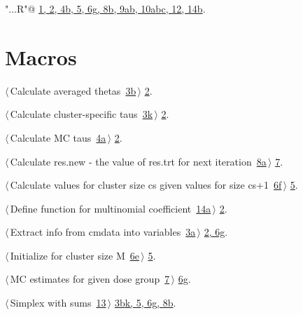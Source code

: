 \documentclass[reqno]{amsart}
\renewcommand{\NWlink}[2]{\hyperlink{#1}{#2}}
\begin{document}
{\small\begin{list}{}{\setlength{\itemsep}{-\parsep}\setlength{\itemindent}{-\leftmargin}}
\item \verb@"..\R\ExchMultinomial.R"@ {\footnotesize {\NWtxtDefBy} \NWlink{nuweb1}{1}\NWlink{nuweb2}{, 2}\NWlink{nuweb4b}{, 4b}\NWlink{nuweb5}{, 5}\NWlink{nuweb6g}{, 6g}\NWlink{nuweb8b}{, 8b}\NWlink{nuweb9a}{, 9a}\NWlink{nuweb9b}{b}\NWlink{nuweb10a}{, 10a}\NWlink{nuweb10b}{b}\NWlink{nuweb10c}{c}\NWlink{nuweb12}{, 12}\NWlink{nuweb14b}{, 14b}.
}
\end{list}}

\section{Macros}


{\small\begin{list}{}{\setlength{\itemsep}{-\parsep}\setlength{\itemindent}{-\leftmargin}}
\item $\langle\,$Calculate averaged thetas\nobreak\ {\footnotesize \NWlink{nuweb3b}{3b}}$\,\rangle$ {\footnotesize {\NWtxtRefIn} \NWlink{nuweb2}{2}.}
\item $\langle\,$Calculate cluster-specific taus\nobreak\ {\footnotesize \NWlink{nuweb3k}{3k}}$\,\rangle$ {\footnotesize {\NWtxtRefIn} \NWlink{nuweb2}{2}.}
\item $\langle\,$Calculate MC taus\nobreak\ {\footnotesize \NWlink{nuweb4a}{4a}}$\,\rangle$ {\footnotesize {\NWtxtRefIn} \NWlink{nuweb2}{2}.}
\item $\langle\,$Calculate res.new - the value of res.trt for next iteration\nobreak\ {\footnotesize \NWlink{nuweb8a}{8a}}$\,\rangle$ {\footnotesize {\NWtxtRefIn} \NWlink{nuweb7}{7}.}
\item $\langle\,$Calculate values for cluster size cs given values for size cs+1\nobreak\ {\footnotesize \NWlink{nuweb6f}{6f}}$\,\rangle$ {\footnotesize {\NWtxtRefIn} \NWlink{nuweb5}{5}.}
\item $\langle\,$Define function for multinomial coefficient\nobreak\ {\footnotesize \NWlink{nuweb14a}{14a}}$\,\rangle$ {\footnotesize {\NWtxtRefIn} \NWlink{nuweb2}{2}.}
\item $\langle\,$Extract info from cmdata into variables\nobreak\ {\footnotesize \NWlink{nuweb3a}{3a}}$\,\rangle$ {\footnotesize {\NWtxtRefIn} \NWlink{nuweb2}{2}\NWlink{nuweb6g}{, 6g}.
}
\item $\langle\,$Initialize for cluster size M\nobreak\ {\footnotesize \NWlink{nuweb6e}{6e}}$\,\rangle$ {\footnotesize {\NWtxtRefIn} \NWlink{nuweb5}{5}.}
\item $\langle\,$MC estimates for given dose group\nobreak\ {\footnotesize \NWlink{nuweb7}{7}}$\,\rangle$ {\footnotesize {\NWtxtRefIn} \NWlink{nuweb6g}{6g}.}
\item $\langle\,$Simplex with sums\nobreak\ {\footnotesize \NWlink{nuweb13}{13}}$\,\rangle$ {\footnotesize {\NWtxtRefIn} \NWlink{nuweb3b}{3b}\NWlink{nuweb3k}{k}\NWlink{nuweb5}{, 5}\NWlink{nuweb6g}{, 6g}\NWlink{nuweb8b}{, 8b}.
}
\end{list}}
\end{document}
